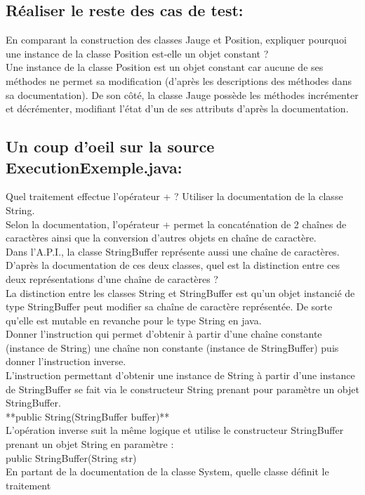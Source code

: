 \documentclass{article}
\begin{document}
\subsection{Réaliser le reste des cas de test:}
En comparant la construction des classes Jauge et Position, expliquer pourquoi une
instance de la classe Position est-elle un objet constant ?\\
Une instance de la classe Position est un objet constant car aucune de ses méthodes ne
permet sa modification (d’après les descriptions des méthodes dans sa documentation). De
son côté, la classe Jauge possède les méthodes incrémenter et décrémenter, modifiant l’état d’un de ses attributs d’après la documentation.
\newline
\subsection{Un coup d'oeil sur la source ExecutionExemple.java:}
Quel traitement effectue l’opérateur + ? Utiliser la documentation de la classe String.
\\
Selon la documentation, l’opérateur + permet la concaténation de 2 chaînes de caractères
ainsi que la conversion d’autres objets en chaîne de caractère.
\\
Dans l’A.P.I., la classe StringBuffer représente aussi une chaîne de caractères.
D’après la documentation de ces deux classes, quel est la distinction entre ces deux
représentations d’une chaîne de caractères ?\\
La distinction entre les classes String et StringBuffer est qu’un objet instancié de type
StringBuffer peut modifier sa chaîne de caractère représentée. De sorte qu'elle est mutable en revanche pour le type String en java.\\
Donner l’instruction qui permet d’obtenir à partir d’une chaîne constante (instance de String) une chaîne non constante (instance de StringBuffer) puis donner l’instruction inverse.\\
L’instruction permettant d’obtenir une instance de String à partir d’une instance de
StringBuffer se fait via le constructeur String prenant pour paramètre un objet
StringBuffer.\\
**public String(StringBuffer buffer)**\\
L’opération inverse suit la même logique et utilise le constructeur StringBuffer prenant
un objet String en paramètre :\\
public StringBuffer(String str)\\
En partant de la documentation de la classe System, quelle classe définit le traitement
\end{document}
